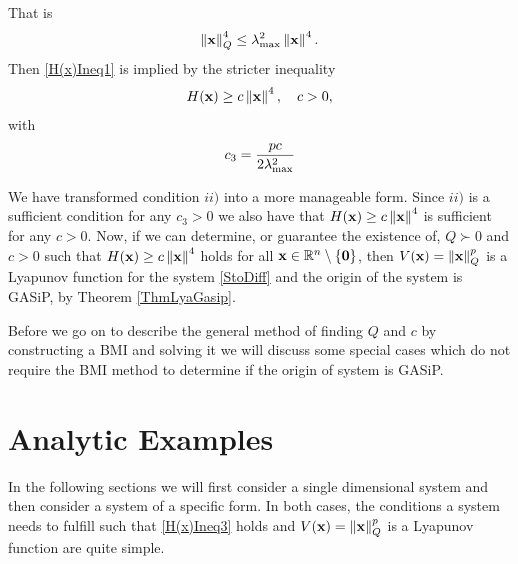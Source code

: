 \documentclass[a4paper,12pt,twoside,BCOR=10mm]{scrbook}
\begin{document}
That is
\fi
\begin{align*}
    \left\lVert\mathbf{x}\right\rVert_{Q}^{4} \leq \lambda_{\max}^2 \left\lVert\mathbf{x}\right\rVert^4.
\end{align*}
Then \eqref{H(x)Ineq1} is implied by the stricter inequality
\begin{align}\label{H(x)Ineq3}
    H(\mathbf{x}) \geq c\left\lVert\mathbf{x}\right\rVert_{}^{4}, \quad c > 0,
\end{align}
with
\begin{align*}
    c_3 = \frac{pc}{2 \lambda_{\max}^2}
\end{align*}
\fi

We have transformed condition $ii)$ into a more manageable form. Since $ii)$ is a sufficient condition for any $c_3 > 0$ we also have that $H(\mathbf{x}) \geq c\left\lVert\mathbf{x}\right\rVert_{}^{4}$ is sufficient for any $c > 0$. Now, if we can determine, or guarantee the existence of, $Q \succ 0$ and $c > 0$ such that $H(\mathbf{x}) \geq c\left\lVert\mathbf{x}\right\rVert_{}^{4}$ holds for all $\mathbf{x} \in \mathbb{R}^{n}\setminus \{\mathbf{0}\}$, then $V(\mathbf{x}) = \left\lVert\mathbf{x}\right\rVert_{Q}^{p}$ is a Lyapunov function for the system \eqref{StoDiff} and the origin of the system is GASiP, by Theorem \ref{ThmLyaGasip}.

Before we go on to describe the general method of finding $Q$ and $c$ by constructing a BMI and solving it we will discuss some special cases which do not require the BMI method to determine if the origin of system is GASiP.

\section{Analytic Examples}\label{SectionAnalyticExamples}
In the following sections we will first consider a single dimensional system and then consider a system of a specific form. In both cases, the conditions a system needs to fulfill such that \eqref{H(x)Ineq3} holds and $V(\mathbf{x}) = \left\lVert\mathbf{x}\right\rVert_Q^p$ is a Lyapunov function are quite simple.
\end{document}
